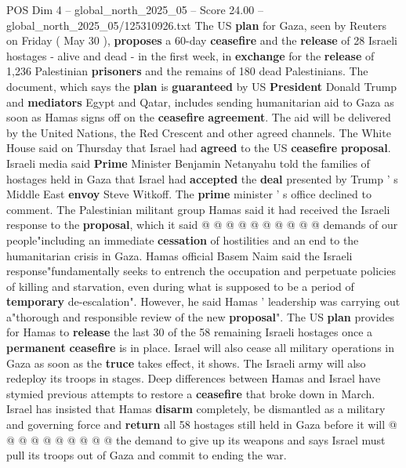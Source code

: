 \begin{textsample}{POS Dim 4 – global\_north\_2025\_05 – Score 24.00 – global\_north\_2025\_05/125310926.txt}  \label{ex:f4_pos_217}
The US \textbf{plan} for Gaza, seen by Reuters on Friday ( May 30 ), \textbf{proposes} a 60-day \textbf{ceasefire} and the \textbf{release} of 28 Israeli hostages - alive and dead - in the first week, in \textbf{exchange} for the \textbf{release} of 1,236 Palestinian \textbf{prisoners} and the remains of 180 dead Palestinians.
The document, which says the \textbf{plan} is \textbf{guaranteed} by US \textbf{President} Donald Trump and \textbf{mediators} Egypt and Qatar, includes sending humanitarian aid to Gaza as soon as Hamas signs off on the \textbf{ceasefire} \textbf{agreement}.
The aid will be delivered by the United Nations, the Red Crescent and other agreed channels.
The White House said on Thursday that Israel had \textbf{agreed} to the US \textbf{ceasefire} \textbf{proposal}.
Israeli media said \textbf{Prime} Minister Benjamin Netanyahu told the families of hostages held in Gaza that Israel had \textbf{accepted} the \textbf{deal} presented by Trump ' s Middle East \textbf{envoy} Steve Witkoff.
The \textbf{prime} minister ' s office declined to comment.
The Palestinian militant group Hamas said it had received the Israeli response to the \textbf{proposal}, which it said @ @ @ @ @ @ @ @ @ @ demands of our people"including an immediate \textbf{cessation} of hostilities and an end to the humanitarian crisis in Gaza.
Hamas official Basem Naim said the Israeli response"fundamentally seeks to entrench the occupation and perpetuate policies of killing and starvation, even during what is supposed to be a period of \textbf{temporary} de-escalation".
However, he said Hamas ' leadership was carrying out a"thorough and responsible review of the new \textbf{proposal}".
The US \textbf{plan} provides for Hamas to \textbf{release} the last 30 of the 58 remaining Israeli hostages once a \textbf{permanent} \textbf{ceasefire} is in place.
Israel will also cease all military operations in Gaza as soon as the \textbf{truce} takes effect, it shows.
The Israeli army will also redeploy its troops in stages.
Deep differences between Hamas and Israel have stymied previous attempts to restore a \textbf{ceasefire} that broke down in March.
Israel has insisted that Hamas \textbf{disarm} completely, be dismantled as a military and governing force and \textbf{return} all 58 hostages still held in Gaza before it will @ @ @ @ @ @ @ @ @ @ the demand to give up its weapons and says Israel must pull its troops out of Gaza and commit to ending the war.

\end{textsample}
